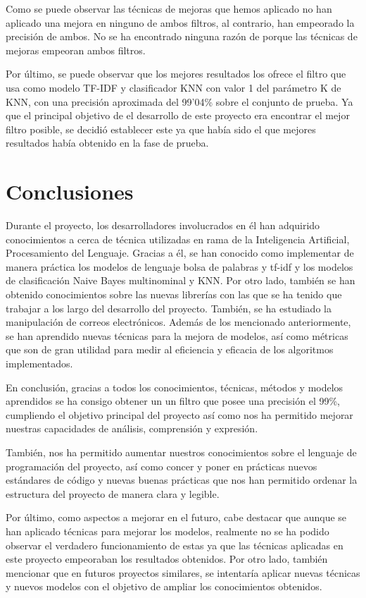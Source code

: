 \documentclass[conference,a4paper]{IEEEtran}
\begin{document}
Como se puede observar las técnicas de mejoras que hemos aplicado no han aplicado una mejora en ninguno de ambos filtros, al contrario, han empeorado la precisión de ambos. No se ha encontrado ninguna razón de porque las técnicas de mejoras empeoran ambos filtros.

Por último, se puede observar que los mejores resultados los ofrece el filtro que usa como modelo TF-IDF y clasificador KNN con valor 1 del parámetro K de KNN, con una precisión aproximada del 99’04\% sobre el conjunto de prueba. Ya que el principal objetivo de el desarrollo de este proyecto era encontrar el mejor filtro posible, se decidió establecer este ya que había sido el que mejores resultados había obtenido en la fase de prueba.





\section{Conclusiones}

Durante el proyecto, los desarrolladores involucrados en él han adquirido conocimientos a cerca de técnica utilizadas en rama de la Inteligencia Artificial, Procesamiento del Lenguaje. Gracias a él, se han conocido como implementar de manera práctica los modelos de lenguaje bolsa de palabras y tf-idf y los modelos de clasificación Naive Bayes multinominal y KNN. Por otro lado, también se han obtenido conocimientos sobre las nuevas librerías con las que se ha tenido que trabajar a los largo del desarrollo del proyecto. También, se ha estudiado la manipulación de correos electrónicos. Además de los mencionado anteriormente, se han aprendido nuevas técnicas para la mejora de modelos, así como métricas que son de gran utilidad para medir al eficiencia y eficacia de los algoritmos implementados.

En conclusión, gracias a todos los conocimientos, técnicas, métodos y modelos aprendidos se ha consigo obtener un un filtro que posee una precisión el 99\%, cumpliendo el objetivo principal del proyecto así como nos ha permitido mejorar nuestras capacidades de análisis, comprensión y expresión.

También, nos ha permitido aumentar nuestros conocimientos sobre el lenguaje de programación del proyecto, así como concer y poner en prácticas nuevos estándares de código y nuevas buenas prácticas que nos han permitido ordenar la estructura del proyecto de manera clara y legible.

Por último, como aspectos a mejorar en el futuro, cabe destacar que aunque se han aplicado técnicas para mejorar los modelos, realmente no se ha podido observar el verdadero funcionamiento de estas ya que las técnicas aplicadas en este proyecto empeoraban los resultados obtenidos. Por otro lado, también mencionar que en futuros proyectos similares, se intentaría aplicar nuevas técnicas y nuevos modelos con el objetivo de ampliar los conocimientos obtenidos.
\end{document}
